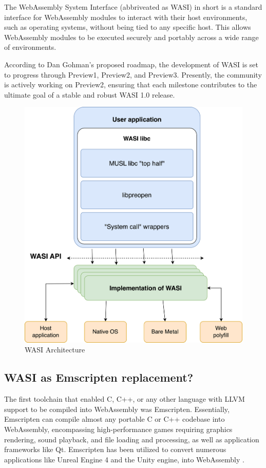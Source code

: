 The WebAssembly System Interface (abbriveated as WASI) in short is a standard interface for WebAssembly modules to interact with their host environments, such as operating systems, without being tied to any specific host. This allows WebAssembly modules to be executed securely and portably across a wide range of environments. 

According to Dan Gohman's proposed roadmap, the development of WASI is set to progress through Preview1, Preview2, and Preview3. Presently, the community is actively working on Preview2, ensuring that each milestone contributes to the ultimate goal of a stable and robust WASI 1.0 release. 

\begin{figure}[H]
	\centering
		\includegraphics[width=130mm,scale=0.8]{images/wasm/WASI_Architecture.png}
	\caption{WASI Architecture}
	\label{fig:wasi-architecture}
\end{figure}

\subsection{WASI as Emscripten replacement?}
The first toolchain that enabled C, C++, or any other language with \gls{LLVM} support to be compiled into WebAssembly was Emscripten. Essentially, Emscripten can compile almost any portable C or C++ codebase into WebAssembly, encompassing high-performance games requiring graphics rendering, sound playback, and file loading and processing, as well as application frameworks like Qt. Emscripten has been utilized to convert numerous applications like Unreal Engine 4 and the Unity engine, into WebAssembly \cite{emscriptencommunity_2023_emscripten}. 

